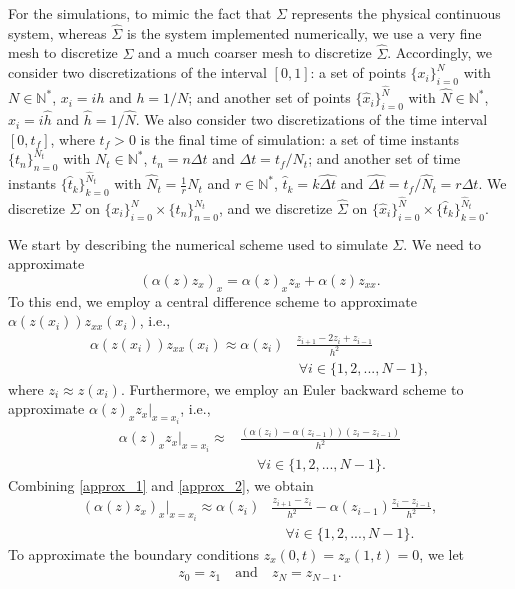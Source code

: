 \documentclass[twocolumn]{autart}
\begin{document}
For the simulations, to mimic the fact that $\Sigma$ represents the physical continuous system, whereas $\hat{\Sigma}$ is the system implemented numerically, we use a very fine mesh to discretize $\Sigma$ and a much coarser mesh to discretize $\hat{\Sigma}$. Accordingly, we consider two discretizations of the interval $[0,1]$: a set of points $\{x_i\}_{i=0}^{N}$ with $N\in \mathbb{N}^*$, $x_i=ih$ and $h=1/N$; and another set of points $\{\hat{x}_i\}_{i=0}^{\hat{N}}$ with $\hat{N} \in \mathbb{N}^*$, $\hat{x}_i = i \hat{h}$ and $\hat{h} = 1/\hat{N}$. We also consider two discretizations of the time interval $[0,t_f]$, where $t_f>0$ is the final time of simulation: a set of time instants $\{t_n\}_{n=0}^{N_t}$ with $N_t\in \mathbb{N}^*$, $t_n = n \Delta t$ and $\Delta t = t_f/N_t$; and another set of time instants $\{\hat{t}_k\}_{k=0}^{\hat{N}_t}$ with $\hat{N}_t = \frac{1}{r}N_t$ and $r\in \mathbb{N}^*$, $\hat{t}_k = k\widehat{\Delta t}$ and $\widehat{\Delta t} = t_f/\hat{N}_t = r\Delta t$. We discretize $\Sigma$ on $\{x_i\}_{i=0}^N\times \{t_n\}_{n=0}^{N_t}$, and we discretize $\hat{\Sigma}$ on $\{\hat{x}_i\}_{i=0}^{\hat{N}}\times \{\hat{t}_k\}_{k=0}^{\hat{N}_t}$. 

We start by describing the numerical scheme used to simulate $\Sigma$. We need to approximate 
$$\left(\alpha(z)z_x\right)_x = \alpha(z)_x z_x + \alpha(z)z_{xx}.$$
To this end, we employ a central difference scheme to approximate $\alpha (z(x_i))z_{xx}(x_i)$, i.e., 
\begin{align}
\alpha(z(x_i))z_{xx}(x_i) \approx \alpha(z_i)&\frac{z_{i+1}-2z_i+z_{i-1}}{h^2} \nonumber \\
&~ \forall i\in \{1,2,...,N-1\}, \label{approx_1}
\end{align}
where $z_i \approx z(x_i)$. Furthermore, we employ an Euler backward scheme to approximate $\alpha(z)_xz_x\big|_{x=x_i}$, i.e., 
\begin{align}
\alpha(z)_xz_x\big|_{x=x_i} \approx &\frac{(\alpha(z_i)-\alpha(z_{i-1}))(z_i-z_{i-1})}{h^2} \nonumber \\
&~\quad \forall i\in \{1,2,...,N-1\}.  \label{approx_2}
\end{align}
Combining \eqref{approx_1} and \eqref{approx_2}, we obtain 
\begin{align}
\left(\alpha(z)z_x\right)_x \big|_{x=x_i} \approx \alpha(z_i)&\frac{z_{i+1}-z_i}{h^2}-\alpha(z_{i-1})\frac{z_i-z_{i-1}}{h^2}, \nonumber \\
&\quad \forall i\in \{1,2,...,N-1\}. \nonumber 
\end{align}
To approximate the boundary conditions $z_x(0,t)=z_x(1,t)=0$, we let 
\begin{align*}
z_0 = z_1 \quad \text{and} \quad z_N=z_{N-1}. 
\end{align*}
\end{document}
